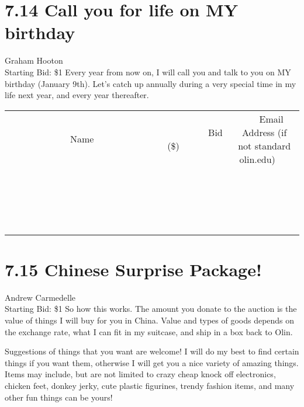 \documentclass[11pt]{article}
\begin{document}
\section*{7.14 Call you for life on MY birthday}
Graham Hooton
\\
Starting Bid: \$1
\newline
Every year from now on, I will call you and talk to you on MY birthday (January 9th). Let's catch up annually during a very special time in my life next year, and every year thereafter.
\\[3ex]
\begin{tabular}{c c c}
~~~~~~~~~~~~~Name~~~~~~~~~~~~~ & ~~~~~~~~~Bid (\$)~~~~~~~~~  & ~~~Email Address (if not standard olin.edu)~~~\\
 & & \\
\hline
 & & \\
\hline
 & & \\
\hline
 & & \\
\hline
 & & \\
\hline
 & & \\
\hline
 & & \\
\hline
 & & \\
\hline
 & & \\
\hline
 & & \\
\hline
 & & \\
\hline
 & & \\
\hline
 & & \\
\hline
 & & \\
\hline
 & & \\
\hline
 & & \\
\hline
 & & \\
\hline
 & & \\
\hline
 & & \\
\hline
\end{tabular}
\newpage
\section*{7.15 Chinese Surprise Package!}
Andrew Carmedelle
\\
Starting Bid: \$1
\newline
So how this works. The amount you donate to the auction is the value of things I will buy for you in China. Value and types of goods depends on the exchange rate, what I can fit in my suitcase, and ship in a box back to Olin.

Suggestions of things that you want are welcome! I will do my best to find certain things if you want them, otherwise I will get you a nice variety of amazing things. Items may include, but are not limited to crazy cheap knock off electronics, chicken feet, donkey jerky, cute plastic figurines, trendy fashion items, and many other fun things can be yours!
\end{document}
